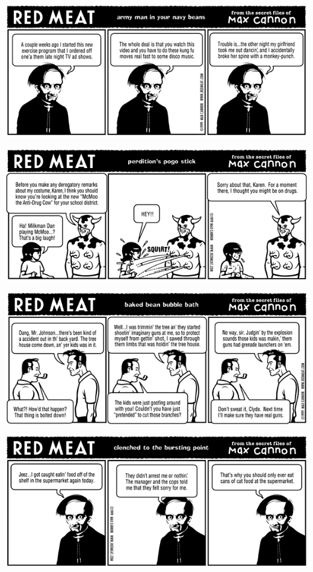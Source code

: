 \documentclass[a4paper,twoside,11pt]{article}
\begin{document}
\includegraphics[width=\textwidth]{redmeat_1999-04-12.png}



\includegraphics[width=\textwidth]{redmeat_1999-04-19.png}



\includegraphics[width=\textwidth]{redmeat_1999-04-26.png}



\includegraphics[width=\textwidth]{redmeat_1999-05-03.png}
\end{document}
